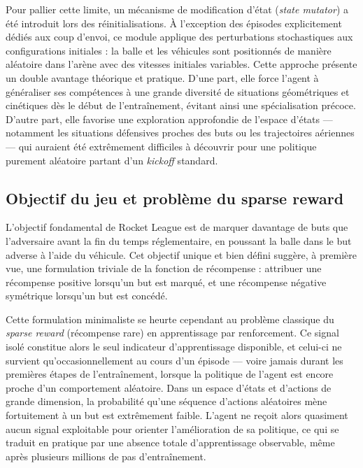 Pour pallier cette limite, un mécanisme de modification d'état (\textit{state mutator}) a été introduit lors des réinitialisations. À l'exception des épisodes explicitement dédiés aux coup d'envoi, ce module applique des perturbations stochastiques aux configurations initiales : la balle et les véhicules sont positionnés de manière aléatoire dans l'arène avec des vitesses initiales variables. Cette approche présente un double avantage théorique et pratique. D'une part, elle force l'agent à généraliser ses compétences à une grande diversité de situations géométriques et cinétiques dès le début de l'entraînement, évitant ainsi une spécialisation précoce. D'autre part, elle favorise une exploration approfondie de l'espace d'états — notamment les situations défensives proches des buts ou les trajectoires aériennes — qui auraient été extrêmement difficiles à découvrir pour une politique purement aléatoire partant d'un \textit{kickoff} standard.

\subsection{Objectif du jeu et problème du sparse reward}
\label{sec:reward_sparse}

L'objectif fondamental de Rocket League est de marquer davantage de buts que l'adversaire avant la fin du temps réglementaire, en poussant la balle dans le but adverse à l'aide du véhicule. Cet objectif unique et bien défini suggère, à première vue, une formulation triviale de la fonction de récompense : attribuer une récompense positive lorsqu'un but est marqué, et une récompense négative symétrique lorsqu'un but est concédé.

Cette formulation minimaliste se heurte cependant au problème classique du \textit{sparse reward} (récompense rare) en apprentissage par renforcement. Ce signal isolé constitue alors le seul indicateur d'apprentissage disponible, et celui-ci ne survient qu'occasionnellement au cours d'un épisode — voire jamais durant les premières étapes de l'entraînement, lorsque la politique de l'agent est encore proche d'un comportement aléatoire. Dans un espace d'états et d'actions de grande dimension, la probabilité qu'une séquence d'actions aléatoires mène fortuitement à un but est extrêmement faible. L'agent ne reçoit alors quasiment aucun signal exploitable pour orienter l'amélioration de sa politique, ce qui se traduit en pratique par une absence totale d'apprentissage observable, même après plusieurs millions de pas d'entraînement.

